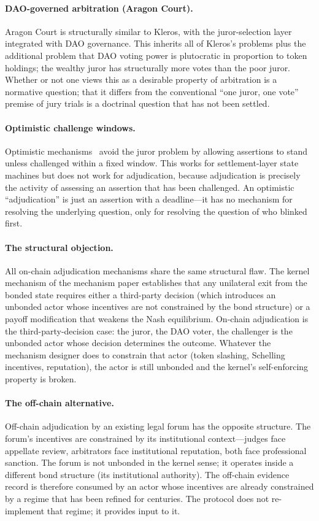 \documentclass[11pt,a4paper]{article}
\theoremstyle{remark}
\begin{document}
\paragraph{DAO-governed arbitration (Aragon Court).}
Aragon Court is structurally similar to Kleros, with the
juror-selection layer integrated with DAO governance. This
inherits all of Kleros's problems plus the additional problem
that DAO voting power is plutocratic in proportion to token
holdings; the wealthy juror has structurally more votes than the
poor juror. Whether or not one views this as a desirable
property of arbitration is a normative question; that it differs
from the conventional ``one juror, one vote'' premise of jury
trials is a doctrinal question that has not been settled.

\paragraph{Optimistic challenge windows.}
Optimistic mechanisms~\citep{optimism2021,uma2020} avoid the juror
problem by allowing assertions to stand unless challenged within a
fixed window. This works for settlement-layer state machines but
does not work for adjudication, because adjudication is precisely
the activity of assessing an assertion that has been challenged.
An optimistic ``adjudication'' is just an assertion with a
deadline---it has no mechanism for resolving the underlying
question, only for resolving the question of who blinked first.

\paragraph{The structural objection.}
All on-chain adjudication mechanisms share the same structural
flaw. The kernel mechanism of the mechanism paper
establishes that any unilateral exit from the bonded state
requires either a third-party decision (which introduces an
unbonded actor whose incentives are not constrained by the bond
structure) or a payoff modification that weakens the Nash
equilibrium. On-chain adjudication is the third-party-decision
case: the juror, the DAO voter, the challenger is the unbonded
actor whose decision determines the outcome. Whatever the
mechanism designer does to constrain that actor (token slashing,
Schelling incentives, reputation), the actor is still unbonded
and the kernel's self-enforcing property is broken.

\paragraph{The off-chain alternative.}
Off-chain adjudication by an existing legal forum has the
opposite structure. The forum's incentives are constrained by
its institutional context---judges face appellate review,
arbitrators face institutional reputation, both face professional
sanction. The forum is not unbonded in the kernel sense; it
operates inside a different bond structure (its institutional
authority). The off-chain evidence record is therefore consumed
by an actor whose incentives are already constrained by a regime
that has been refined for centuries. The protocol does not
re-implement that regime; it provides input to it.
\end{document}
